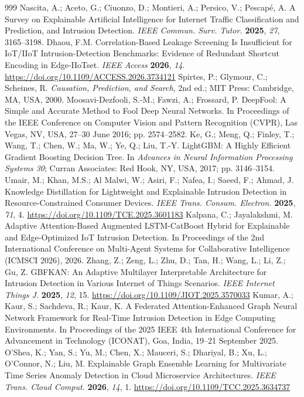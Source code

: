 \begin{thebibliography}{999}
Nascita, A.; Aceto, G.; Ciuonzo, D.; Montieri, A.; Persico, V.; Pescapé, A. A Survey on Explainable Artificial Intelligence for Internet Traffic Classification and Prediction, and Intrusion Detection. \textit{IEEE Commun. Surv. Tutor.} \textbf{2025}, \textit{27}, 3165--3198.
Dhaou, F.M. Correlation-Based Leakage Screening Is Insufficient for IoT/IIoT Intrusion-Detection Benchmarks: Evidence of Redundant Shortcut Encoding in Edge-IIoTset. \textit{IEEE Access} \textbf{2026}, \textit{14}. \url{https://doi.org/10.1109/ACCESS.2026.3734121}
Spirtes, P.; Glymour, C.; Scheines, R. \textit{Causation, Prediction, and Search}, 2nd ed.; MIT Press: Cambridge, MA, USA, 2000.
Moosavi-Dezfooli, S.-M.; Fawzi, A.; Frossard, P. DeepFool: A Simple and Accurate Method to Fool Deep Neural Networks. In Proceedings of the IEEE Conference on Computer Vision and Pattern Recognition (CVPR), Las Vegas, NV, USA, 27--30 June 2016; pp. 2574--2582.
Ke, G.; Meng, Q.; Finley, T.; Wang, T.; Chen, W.; Ma, W.; Ye, Q.; Liu, T.-Y. LightGBM: A Highly Efficient Gradient Boosting Decision Tree. In \textit{Advances in Neural Information Processing Systems 30}; Curran Associates: Red Hook, NY, USA, 2017; pp. 3146--3154.
Umair, M.; Khan, M.S.; Al Malwi, W.; Asiri, F.; Nafea, I.; Saeed, F.; Ahmad, J. Knowledge Distillation for Lightweight and Explainable Intrusion Detection in Resource-Constrained Consumer Devices. \textit{IEEE Trans. Consum. Electron.} \textbf{2025}, \textit{71}, 4. \url{https://doi.org/10.1109/TCE.2025.3601183}
Kalpana, C.; Jayalakshmi, M. Adaptive Attention-Based Augmented LSTM-CatBoost Hybrid for Explainable and Edge-Optimized IoT Intrusion Detection. In Proceedings of the 2nd International Conference on Multi-Agent Systems for Collaborative Intelligence (ICMSCI 2026), 2026.
Zhang, Z.; Zeng, L.; Zhu, D.; Tan, H.; Wang, L.; Li, Z.; Gu, Z. GBFKAN: An Adaptive Multilayer Interpretable Architecture for Intrusion Detection in Various Internet of Things Scenarios. \textit{IEEE Internet Things J.} \textbf{2025}, \textit{12}, 15. \url{https://doi.org/10.1109/JIOT.2025.3570033}
Kumar, A.; Kaur, S.; Sachdeva, R.; Kaur, K. A Federated Attention-Enhanced Graph Neural Network Framework for Real-Time Intrusion Detection in Edge Computing Environments. In Proceedings of the 2025 IEEE 4th International Conference for Advancement in Technology (ICONAT), Goa, India, 19--21 September 2025.
O'Shea, K.; Yan, S.; Yu, M.; Chen, X.; Mauceri, S.; Dhariyal, B.; Xu, L.; O'Connor, N.; Liu, M. Explainable Graph Ensemble Learning for Multivariate Time Series Anomaly Detection in Cloud Microservice Architectures. \textit{IEEE Trans. Cloud Comput.} \textbf{2026}, \textit{14}, 1. \url{https://doi.org/10.1109/TCC.2025.3634737}

\end{thebibliography}
